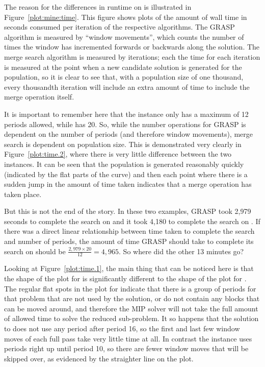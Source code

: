 \documentclass[journal]{IEEEtran}
\begin{document}
The reason for the differences in runtime on \dmine{} is illustrated in Figure~\ref{plot:mine:time}.
This figure shows plots of the amount of wall time in seconds consumed per iteration of the respective algorithms. The GRASP algorithm is measured by ``window movements'', which counts the number of times the window has incremented forwards or backwards along the solution. The merge search algorithm is measured by iterations; each the time for each iteration is measured at the point when a new candidate solution is generated for the population, so it is clear to see that, with a population size of one thousand, every thousandth iteration will include an extra amount of time to include the merge operation itself. 

It is important to remember here that the \dmine{} instance only has a maximum of 12 periods allowed, while \zucksmall{} has 20. So, while the number operations for GRASP is dependent on the number of periods (and therefore window movements), merge search is dependent on population size. This is demonstrated very clearly in Figure~\ref{plot:time.2}, where there is very little difference between the two instances. It can be seen that the population is generated reasonably quickly (indicated by the flat parts of the curve) and then each point where there is a sudden jump in the amount of time taken indicates that a merge operation has taken place.


But this is not the end of the story. In these two examples, GRASP took 2,979 seconds to complete the search on \dmine{} and it took 4,180 to complete the search on \zucksmall{}. If there was a direct linear relationship between time taken to complete the search and number of periods, the amount of time GRASP should take to complete its search on \zucksmall{} should be \(\frac{2,979\times20}{12} = 4,965\). So where did the other 13 minutes go?

Looking at Figure~\ref{plot:time.1}, the main thing that can be noticed here is that the shape of the plot for \zucksmall{} is significantly different to the shape of the plot for \dmine{}. The regular flat spots in the plot for \zucksmall{} indicate that there is a group of periods for that problem that are not used by the solution, or do not contain any blocks that can be moved around, and therefore the MIP solver will not take the full amount of allowed time to solve the reduced sub-problem. It so happens that the solution to \zucksmall{} does not use any period after period 16, so the first and last few window moves of each full pass take very little time at all. In contrast the \dmine{} instance uses periods right up until period 10, so there are fewer window moves that will be skipped over, as evidenced by the straighter line on the plot.
\end{document}
